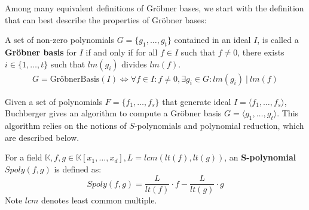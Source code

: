 Among many equivalent definitions of Gr\"obner bases, we start with the definition that can best describe the 
properties of Gr\"obner bases:

\begin{Definition}
    A set of non-zero polynomials
    $G=\{g_1,\dots,g_t\}$ contained in an ideal $I$, is called a {\bf Gr\"obner
    basis} for $I$ if and only if for all $f \in I$ such that $f \neq 0$,
    there exists $i \in \{1,\dots,t\}$ such that $lm(g_i)$ divides $lm(f)$.
    \begin{eqnarray}
        G = \text{Gr\"obner{Basis}} (I) \iff \forall f \in I: f \neq 0, \exists
        g_i \in G: lm(g_i)\ |\ lm(f)
        \label{eqn:groebnermin}
    \end{eqnarray}
    
\end{Definition}

Given a set of polynomials $F=\{f_{1},\dots,f_{s}\}$ that generate ideal $I=\langle f_{1},\dots,f_{s} \rangle$, 
Buchberger gives an algorithm to compute a Gr\"obner basis $G=\langle g_{1},\dots,g_{t}\rangle$. This algorithm relies on 
the notions of $S$-polynomials and polynomial reduction, which are described below.




\begin{Definition}
    For a field $\mathbb{K}, f, g \in \mathbb{K}[x_1,\dots,x_d], L = lcm\left(lt(f), lt(g)\right)$,
    an {\bf S-polynomial} $Spoly(f,g)$ is defined as:
    \begin{equation}
        Spoly(f,g)=\frac{L}{lt(f)}\cdot f - \frac{L}{lt(g)}\cdot g
        \label{eqn:spoly}
    \end{equation}
Note $lcm$ denotes least common multiple. 
\end{Definition}

